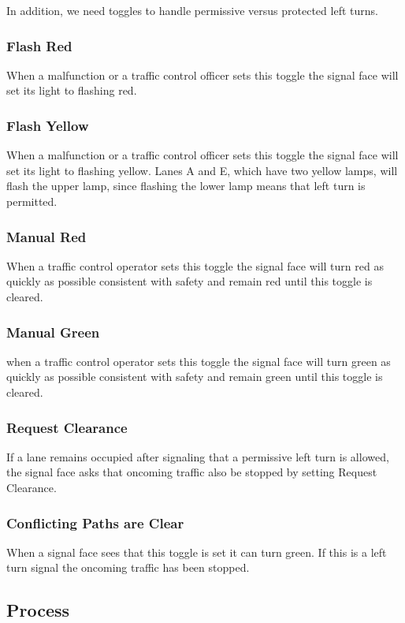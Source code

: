 \documentclass[letterpaper,twoside]{article}
\begin{document}
In addition, we need toggles to handle permissive versus protected
left turns.

\subsubsection{Flash Red}
When a malfunction or a traffic control officer sets this toggle
the signal face will set its light to flashing red.

\subsubsection{Flash Yellow}
When a malfunction or a traffic control officer sets this toggle
the signal face will set its light to flashing yellow.
Lanes A and E, which have two yellow lamps, will flash the upper lamp,
since flashing the lower lamp means that left turn is permitted.

\subsubsection{Manual Red}
When a traffic control operator sets this toggle the signal face will
turn red as quickly as possible consistent with safety and remain
red until this toggle is cleared.

\subsubsection{Manual Green}
when a traffic control operator sets this toggle the signal face will
turn green as quickly as possible consistent with safety and remain
green until this toggle is cleared.

\subsubsection{Request Clearance}
If a lane remains occupied after signaling that a permissive left
turn is allowed, the signal face asks that oncoming traffic also
be stopped by setting Request Clearance.

\subsubsection{Conflicting Paths are Clear}
When a signal face sees that this toggle is set it can turn green.
If this is a left turn signal the oncoming traffic has been stopped.

\subsection{Process}
\end{document}
